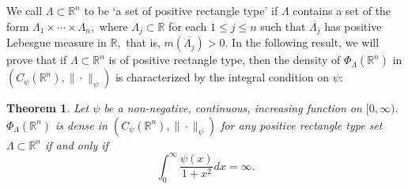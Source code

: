\documentclass [11pt]{amsart}
\newtheorem{Thm}{Theorem}[section]
\newcommand{\R}{\mathbb R}
\newcommand{\be} {\begin{equation}}
\newcommand{\ee} {\end{equation}}
\numberwithin{equation}{section}
\begin{document}
We call $\Lambda \subset \R^n$ to be `a set of positive rectangle type' if $\Lambda$ contains a set of the form $\Lambda_1 \times \cdots \times \Lambda_n,$ where $\Lambda_j \subset \R$ for each $1 \leq j \leq n$ such that $\overline{\Lambda_j}$ has positive Lebesgue measure in $\R,$ that is, $m(\overline{\Lambda_j})>0.$ In the following result, we will prove that if $\Lambda \subset \R^n$ is of positive rectangle type, then the density of $\Phi_{\Lambda}(\R^n)$ in $(C_{\psi}(\R^n),\|\cdot \|_{\psi})$ is characterized by the integral condition on $\psi:$  
\begin{comment}
\begin{Thm}\label{several density}
Let $\psi:[0,\infty) \rightarrow [0,\infty)$ be a continuous, increasing function satisfying 
$$\int_0^{\infty}\dfrac{\psi(x)}{1+x^2}dx=\infty.$$
For any set $\Lambda \subset \R^n$ of positive rectangle type, the subspace $\Phi_{\Lambda}(\R^n)$ is dense in $(C_{\psi}(\R^n),\|\cdot \|_{\psi}).$

Conversely if for any set $\Lambda \subset \R^n$ of positive rectangle type, the subspace $\Phi_{\Lambda}(\R^n)$ is dense in $(C_{\psi}(\R^n),\|\cdot \|_{\psi})$ where $\psi:[0,\infty) \rightarrow [0,\infty)$ is a continuous, increasing function, then   $$\int_0^{\infty}\dfrac{\psi(x)}{1+x^2}dx=\infty.$$ 
\end{Thm}
\end{comment}


\begin{Thm}\label{several density}
Let $\psi$ be a non-negative, continuous, increasing function on $[0,\infty).$ $\Phi_{\Lambda}(\R^n)$ is dense in $(C_{\psi}(\R^n),\|\cdot \|_{\psi})$ for any positive rectangle type set $\Lambda \subset \R^n$ if and only if 
\be \label{psiint} \int_0^{\infty}\dfrac{\psi(x)}{1+x^2}dx=\infty. \ee
\end{Thm}
\end{document}
